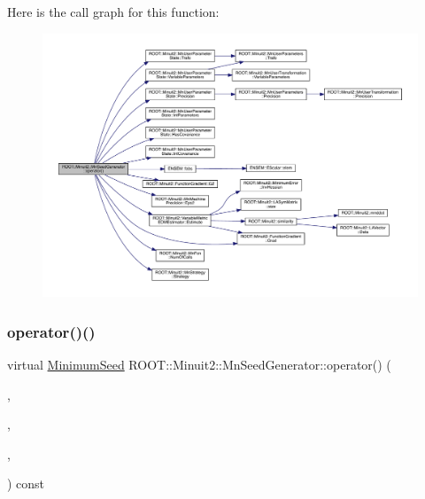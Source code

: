 Here is the call graph for this function\+:\nopagebreak
\begin{figure}[H]
\begin{center}
\leavevmode
\includegraphics[width=350pt]{de/da5/classROOT_1_1Minuit2_1_1MnSeedGenerator_a654d0f1b67cd1a3a17de8334ba811ef0_cgraph}
\end{center}
\end{figure}
\mbox{\label{classROOT_1_1Minuit2_1_1MnSeedGenerator_a1c06ece239f548163beb232600dc8cc3}} 
\subsubsection{\texorpdfstring{operator()()}{operator()()}\hspace{0.1cm}{\footnotesize\ttfamily [2/4]}}
{\footnotesize\ttfamily virtual \mbox{\hyperlink{classROOT_1_1Minuit2_1_1MinimumSeed}{Minimum\+Seed}} R\+O\+O\+T\+::\+Minuit2\+::\+Mn\+Seed\+Generator\+::operator() (\begin{DoxyParamCaption}\item[{const \mbox{\hyperlink{classROOT_1_1Minuit2_1_1MnFcn}{Mn\+Fcn}} \&}]{,  }\item[{const \mbox{\hyperlink{classROOT_1_1Minuit2_1_1GradientCalculator}{Gradient\+Calculator}} \&}]{,  }\item[{const \mbox{\hyperlink{classROOT_1_1Minuit2_1_1MnUserParameterState}{Mn\+User\+Parameter\+State}} \&}]{,  }\item[{const \mbox{\hyperlink{classROOT_1_1Minuit2_1_1MnStrategy}{Mn\+Strategy}} \&}]{ }\end{DoxyParamCaption}) const\hspace{0.3cm}{\ttfamily [virtual]}}




